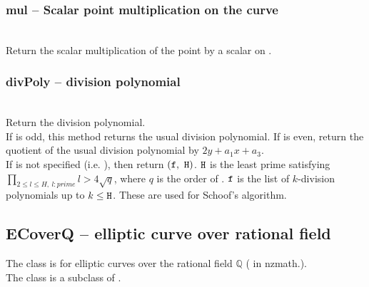   \subsubsection{mul -- Scalar point multiplication on the curve}
   \\
   \spacing
   \quad Return the scalar multiplication of the point  by a scalar  on .\\
   \spacing
%
  \subsubsection{divPoly -- division polynomial}
   \\
   \spacing
   \quad Return the division polynomial.\\
   \spacing
   \quad  If  is odd, this method returns the usual division polynomial. If  is even, return the quotient of the usual division polynomial by $2y + a_1 x + a_3$.\\
 \negok If  is not specified (i.e. ), then return $({\texttt f},\ {\texttt H})$.
 ${\texttt H}$ is the least prime satisfying $\prod_{2\le l \le H,\ l:prime} l > 4\sqrt{q}$, where $q$ is the order of .
 ${\texttt f}$ is the list of $k$-division polynomials up to $k \le {\texttt H}$.
 These are used for Schoof's algorithm.\\
%
\C
 \subsection{ECoverQ -- elliptic curve over rational field}
 The class is for elliptic curves over the rational field $\mathbb{Q}$ ( in nzmath.).\\
 The class is a subclass of .

